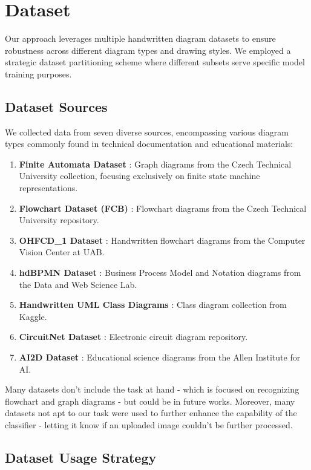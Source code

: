 \documentclass[conference]{IEEEtran}
\begin{document}
\section{Dataset}
Our approach leverages multiple handwritten diagram datasets to ensure robustness across different diagram types and drawing styles. We employed a strategic dataset partitioning scheme where different subsets serve specific model training purposes.

\subsection{Dataset Sources}

We collected data from seven diverse sources, encompassing various diagram types commonly found in technical documentation and educational materials:

\begin{enumerate}
	\item \textbf{Finite Automata Dataset} \cite{online1}: Graph diagrams from the Czech Technical University collection, focusing exclusively on finite state machine representations.
	\item \textbf{Flowchart Dataset (FCB)} \cite{online3}: Flowchart diagrams from the Czech Technical University repository.
	\item \textbf{OHFCD\_1 Dataset} \cite{ohfcd}: Handwritten flowchart diagrams from the Computer Vision Center at UAB.
	\item \textbf{hdBPMN Dataset} \cite{BPMN}: Business Process Model and Notation diagrams from the Data and Web Science Lab.
	\item \textbf{Handwritten UML Class Diagrams} \cite{modelsketch}: Class diagram collection from Kaggle.
	\item \textbf{CircuitNet Dataset} \cite{circuitnet}: Electronic circuit diagram repository.
	\item \textbf{AI2D Dataset} \cite{ai2d}: Educational science diagrams from the Allen Institute for AI.
\end{enumerate}

Many datasets don't include the task at hand - which is focused on recognizing flowchart and graph diagrams - but could be in future works. Moreover, many datasets not apt to our task were used to further enhance the capability of the classifier - letting it know if an uploaded image couldn't be further processed.

\subsection{Dataset Usage Strategy}
\end{document}
